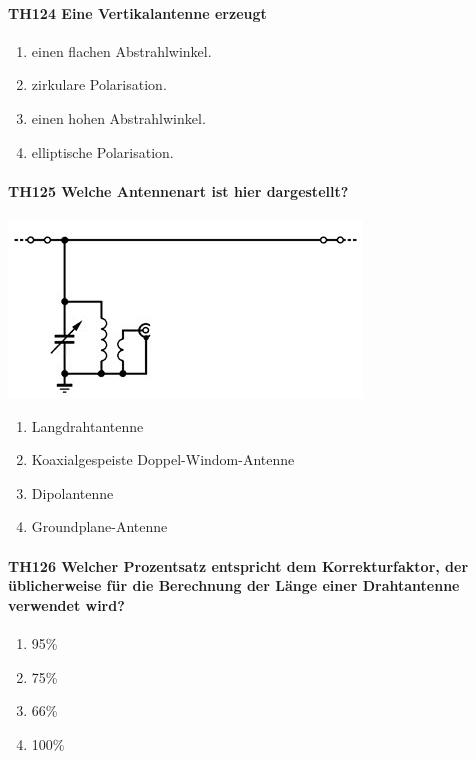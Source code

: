 \documentclass[8pt]{article}
\begin{document}
\paragraph*{TH124 Eine Vertikalantenne erzeugt} 
\begin{enumerate}[nolistsep,label=\Alph*]
\item einen flachen Abstrahlwinkel.
\item zirkulare Polarisation.
\item einen hohen Abstrahlwinkel.
\item elliptische Polarisation.
\end{enumerate}

\paragraph*{TH125 Welche Antennenart ist hier dargestellt?}
\begin{center}
	\begin{minipage}{\linewidth}
		\centering
		\includegraphics[scale=1.0]{pics/th125_a.jpg}
	\end{minipage}
\end{center}
\begin{enumerate}[nolistsep,label=\Alph*]
\item Langdrahtantenne
\item Koaxialgespeiste Doppel-Windom-Antenne
\item Dipolantenne
\item Groundplane-Antenne
\end{enumerate}

\paragraph*{TH126 Welcher Prozentsatz entspricht dem Korrekturfaktor, der üblicherweise für die Berechnung der Länge einer Drahtantenne verwendet wird?}
\begin{enumerate}[nolistsep,label=\Alph*]
\item 95\%
\item 75\%
\item 66\%
\item 100\%
\end{enumerate}
\end{document}
